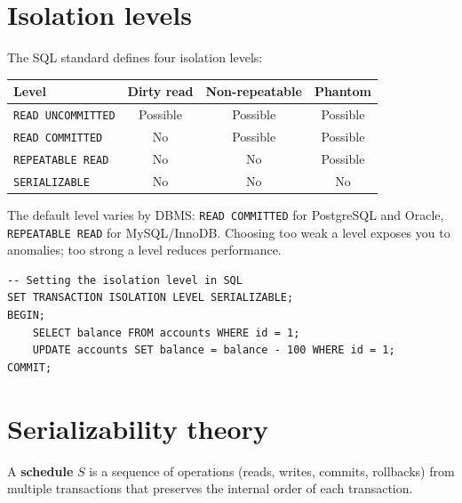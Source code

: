 \section{Isolation levels}

\begin{definition}
The SQL standard defines four isolation levels:
\begin{center}
\begin{tabular}{lccc}
\hline
\textbf{Level} & \textbf{Dirty read} & \textbf{Non-repeatable} & \textbf{Phantom} \\
\hline
\texttt{READ UNCOMMITTED} & Possible & Possible & Possible \\
\texttt{READ COMMITTED}   & No       & Possible & Possible \\
\texttt{REPEATABLE READ}  & No       & No       & Possible \\
\texttt{SERIALIZABLE}     & No       & No       & No \\
\hline
\end{tabular}
\end{center}
\end{definition}

\begin{attention}
The default level varies by DBMS: \texttt{READ COMMITTED} for PostgreSQL
and Oracle, \texttt{REPEATABLE READ} for MySQL/InnoDB. Choosing too weak a
level exposes you to anomalies; too strong a level reduces performance.
\end{attention}

\begin{verbatim}
-- Setting the isolation level in SQL
SET TRANSACTION ISOLATION LEVEL SERIALIZABLE;
BEGIN;
    SELECT balance FROM accounts WHERE id = 1;
    UPDATE accounts SET balance = balance - 100 WHERE id = 1;
COMMIT;
\end{verbatim}

\section{Serializability theory}

\begin{definition}[Schedule]
A \textbf{schedule} $S$ is a sequence of operations (reads, writes,
commits, rollbacks) from multiple transactions that preserves the internal
order of each transaction.
\end{definition}

